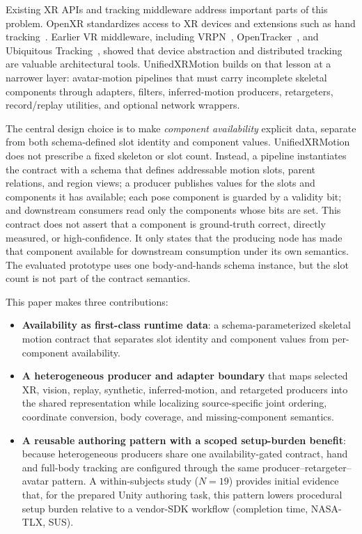 \documentclass[runningheads]{llncs}
\begin{document}
Existing XR APIs and tracking middleware address important parts of this problem. OpenXR standardizes access to XR devices and extensions such as hand tracking~\cite{khronos_openxr_1_0,openxr_ext_hand}. Earlier VR middleware, including VRPN~\cite{taylor2001vrpn}, OpenTracker~\cite{reitmayr2001openarchitecture}, and Ubiquitous Tracking~\cite{newman2004ubiquitous}, showed that device abstraction and distributed tracking are valuable architectural tools. UnifiedXRMotion builds on that lesson at a narrower layer: avatar-motion pipelines that must carry incomplete skeletal components through adapters, filters, inferred-motion producers, retargeters, record/replay utilities, and optional network wrappers.

The central design choice is to make \emph{component availability} explicit data, separate from both schema-defined slot identity and component values. UnifiedXRMotion does not prescribe a fixed skeleton or slot count. Instead, a pipeline instantiates the contract with a schema that defines addressable motion slots, parent relations, and region views; a producer publishes values for the slots and components it has available; each pose component is guarded by a validity bit; and downstream consumers read only the components whose bits are set. This contract does not assert that a component is ground-truth correct, directly measured, or high-confidence. It only states that the producing node has made that component available for downstream consumption under its own semantics. The evaluated prototype uses one body-and-hands schema instance, but the slot count is not part of the contract semantics.

This paper makes three contributions:
\begin{itemize}
	\item \textbf{Availability as first-class runtime data}: a schema-parameterized skeletal motion contract that separates slot identity and component values from per-component availability.
	\item \textbf{A heterogeneous producer and adapter boundary} that maps selected XR, vision, replay, synthetic, inferred-motion, and retargeted producers into the shared representation while localizing source-specific joint ordering, coordinate conversion, body coverage, and missing-component semantics.
	\item \textbf{A reusable authoring pattern with a scoped setup-burden benefit}: because heterogeneous producers share one availability-gated contract, hand and full-body tracking are configured through the same producer--retargeter--avatar pattern. A within-subjects study ($N=19$) provides initial evidence that, for the prepared Unity authoring task, this pattern lowers procedural setup burden relative to a vendor-SDK workflow (completion time, NASA-TLX, SUS).
\end{itemize}
\end{document}
